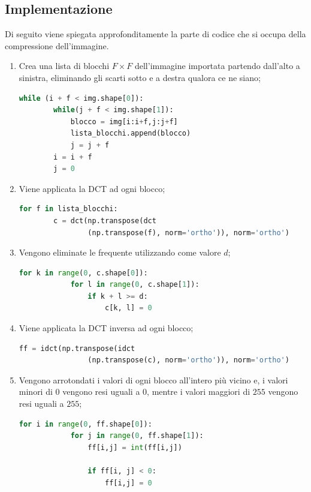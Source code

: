 \documentclass[preprint,12pt]{elsarticle}
\begin{document}
\subsection*{Implementazione}
Di seguito viene spiegata approfonditamente la parte di codice che si occupa della compressione dell'immagine.
\begin{enumerate}
\item Crea una lista di blocchi $F \times F$ dell'immagine importata partendo dall'alto a sinistra, eliminando gli scarti sotto e a destra qualora ce ne siano;

\begin{lstlisting}[language=Python]
while (i + f < img.shape[0]):
        while(j + f < img.shape[1]):
            blocco = img[i:i+f,j:j+f]
            lista_blocchi.append(blocco)
            j = j + f
        i = i + f
        j = 0
\end{lstlisting}

\item Viene applicata la DCT ad ogni blocco;
\begin{lstlisting}[language=Python]
 for f in lista_blocchi:
        c = dct(np.transpose(dct
        		(np.transpose(f), norm='ortho')), norm='ortho')
\end{lstlisting}

\item Vengono eliminate le frequente utilizzando come valore $d$;
\begin{lstlisting}[language=Python]
for k in range(0, c.shape[0]):
            for l in range(0, c.shape[1]):
                if k + l >= d:
                    c[k, l] = 0
\end{lstlisting}

\item Viene applicata la DCT inversa ad ogni blocco;
\begin{lstlisting}[language=Python]
ff = idct(np.transpose(idct
				(np.transpose(c), norm='ortho')), norm='ortho')
\end{lstlisting}

\item Vengono arrotondati i valori di ogni blocco all'intero più vicino e, i valori minori di $0$ vengono resi uguali a $0$, mentre i valori maggiori di $255$ vengono resi uguali a $255$;
\begin{lstlisting}[language=Python]
for i in range(0, ff.shape[0]):
            for j in range(0, ff.shape[1]):
                ff[i,j] = int(ff[i,j])

                if ff[i, j] < 0:
                    ff[i,j] = 0
                    

\end{lstlisting}
\end{enumerate}
\end{document}
